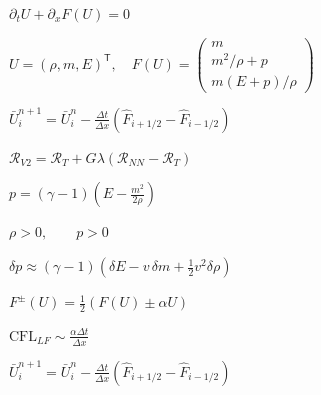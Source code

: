 \documentclass{article}
\begin{document}
\begin{preview}
\hbox{
\color[HTML]{242424}\fontsize{32}{38.4}\selectfont
$\displaystyle \partial_t U+\partial_xF(U)=0$
}
\end{preview}
\begin{preview}
\hbox{
\color[HTML]{242424}\fontsize{25}{30.0}\selectfont
$\displaystyle U=(\rho,m,E)^{\mathsf T},\quad F(U)=\begin{pmatrix}m\\m^2/\rho+p\\m(E+p)/\rho\end{pmatrix}$
}
\end{preview}
\begin{preview}
\hbox{
\color[HTML]{242424}\fontsize{24}{28.799999999999997}\selectfont
$\displaystyle \bar U_i^{n+1}=\bar U_i^n-\frac{\Delta t}{\Delta x}\left(\widehat F_{i+1/2}-\widehat F_{i-1/2}\right)$
}
\end{preview}
\begin{preview}
\hbox{
\color[HTML]{242424}\fontsize{29}{34.8}\selectfont
$\displaystyle \mathcal R_{V2}=\mathcal R_T+G\lambda\left(\mathcal R_{NN}-\mathcal R_T\right)$
}
\end{preview}
\begin{preview}
\hbox{
\color[HTML]{242424}\fontsize{29}{34.8}\selectfont
$\displaystyle p=(\gamma-1)\left(E-\frac{m^2}{2\rho}\right)$
}
\end{preview}
\begin{preview}
\hbox{
\color[HTML]{242424}\fontsize{29}{34.8}\selectfont
$\displaystyle \rho>0,\qquad p>0$
}
\end{preview}
\begin{preview}
\hbox{
\color[HTML]{242424}\fontsize{25}{30.0}\selectfont
$\displaystyle \boxed{\delta p\approx(\gamma-1)\left(\delta E-v\,\delta m+\tfrac12v^2\delta\rho\right)}$
}
\end{preview}
\begin{preview}
\hbox{
\color[HTML]{242424}\fontsize{25}{30.0}\selectfont
$\displaystyle F^\pm(U)=\frac12\left(F(U)\pm\alpha U\right)$
}
\end{preview}
\begin{preview}
\hbox{
\color[HTML]{242424}\fontsize{26}{31.2}\selectfont
$\displaystyle \mathrm{CFL}_{LF}\sim\frac{\alpha\Delta t}{\Delta x}$
}
\end{preview}
\begin{preview}
\hbox{
\color[HTML]{242424}\fontsize{25}{30.0}\selectfont
$\displaystyle \bar U_i^{n+1}=\bar U_i^n-\frac{\Delta t}{\Delta x}\left(\widehat F_{i+1/2}-\widehat F_{i-1/2}\right)$
}
\end{preview}
\end{document}
